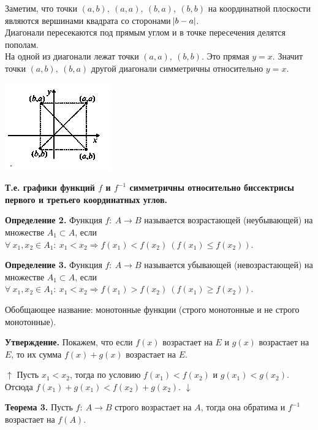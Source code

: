 \documentclass{article}
\begin{document}
    \noindent\begin{minipage}{0.65\textwidth}\raggedright
        Заметим, что точки $(a, b),\ (a, a),\ (b, a),\ (b, b)$ на координатной плоскости являются вершинами квадрата со сторонами $\abs{b - a}$.\\
        Диагонали пересекаются под прямым углом и в точке пересечения делятся пополам.\\
        На одной из диагонали лежат точки $(a, a),\ (b, b)$. Это прямая $y = x$. Значит точки $(a, b),\ (b, a)$ другой диагонали симметричны относительно $y = x$.
    \end{minipage}
    \hfill%
    \begin{minipage}{0.3\textwidth}\raggedleft
        \includegraphics[scale=0.75]{4_4}
    \end{minipage}

    \textbf{Т.е. графики функций $f$ и $f^{-1}$ симметричны относительно биссектрисы первого и третьего координатных углов.}

    \textbf{Определение 2.} Функция $f:\ A \rightarrow B$ называется возрастающей (неубывающей) на множестве $A_1 \subset A$, если $\forall\ x_1, x_2 \in A_1:\ x_1 < x_2 \Rightarrow f(x_1) < f(x_2)\ (f(x_1) \leq f(x_2))$.
    
    \textbf{Определение 3.} Функция $f:\ A \rightarrow B$ называется убывающей (невозрастающей) на множестве $A_1 \subset A$, если $\forall\ x_1, x_2 \in A_1:\ x_1 < x_2 \Rightarrow f(x_1) > f(x_2)\ (f(x_1) \geq f(x_2))$.

    Обобщающее название: монотонные функции (строго монотонные и не строго монотонные).

    \textbf{Утверждение.} Покажем, что если $f(x)$ возрастает на $E$ и $g(x)$ возрастает на $E$, то их сумма $f(x) + g(x)$ возрастает на $E$.
    
    $\uparrow$ Пусть $x_1 < x_2$, тогда по условию $f(x_1) < f(x_2)$ и $g(x_1) < g(x_2)$. Отсюда $f(x_1) + g(x_1) < f(x_2) + g(x_2)$. $\downarrow$

    \textbf{Теорема 3.} Пусть $f:\ A \rightarrow B$ строго возрастает на $A$, тогда она обратима и $f^{-1}$ возрастает на $f(A)$.
\end{document}
